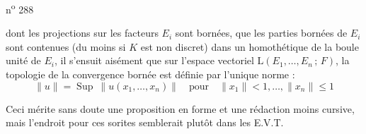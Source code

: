 
\hfill n\textsuperscript{o} 288

dont les projections sur les facteurs $E_i$ sont bornées, que les parties bornées de $E_i$ sont contenues (du moins si $K$ est non discret) dans un homothétique de la boule unité de $E_i$, il s'ensuit aisément que sur l'espace vectoriel $\mathrm{L}(E_1,\ldots,E_n\,;\,F)$, la topologie de la convergence bornée est définie par l'unique norme :
\[
\lVert u\rVert=\operatorname{Sup}\ \lVert u(x_1,\ldots,x_n)\rVert\quad\text{pour}\quad\lVert x_1\rVert<1,\ldots,\lVert x_n\rVert\leq 1
\]

Ceci mérite sans doute une proposition en forme et une rédaction moins cursive, mais l'endroit pour ces sorites semblerait plutôt dans les E.V.T.
